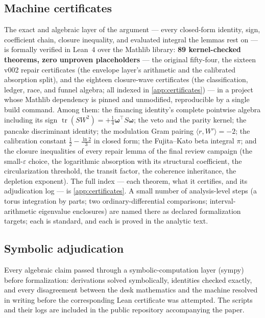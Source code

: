 \documentclass[11pt,letterpaper]{amsart}
\theoremstyle{definition}
\theoremstyle{remark}
\newcommand{\vort}{\boldsymbol{\omega}}
\begin{document}
\subsection{Machine certificates}\label{subsec:lean}
The exact and algebraic layer of the argument --- every closed-form identity, sign,
coefficient chain, closure inequality, and evaluated integral the lemmas rest on ---
is formally verified in Lean~4 over the Mathlib library: \textbf{89 kernel-checked
theorems, zero unproven placeholders} --- the original fifty-four, the
sixteen v002 repair certificates (the envelope layer's arithmetic and the
calibrated absorption split), and the eighteen closure-wave certificates
(the classification, ledger, race, and funnel algebra; all indexed in
\cref{app:certificates}) --- in a project whose Mathlib dependency is
pinned and unmodified, reproducible by a single build command. Among them: the
financing identity's complete pointwise algebra including its sign
$\operatorname{tr}(SW^2)=+\tfrac14\vort^{\top}S\vort$; the veto and the parity kernel;
the pancake discriminant identity; the modulation Gram pairing
$\langle r,W'\rangle=-2$; the calibration constant $\tfrac12-\tfrac{\ln2}{3}$ in
closed form; the Fujita--Kato beta integral $\pi$; and the closure inequalities of
every repair lemma of the final review campaign (the small-$\varepsilon$ choice, the
logarithmic absorption with its structural coefficient, the circularization threshold,
the transit factor, the coherence inheritance, the depletion exponent). The full index
--- each theorem, what it certifies, and its adjudication log --- is
\cref{app:certificates}. A small number of analysis-level steps (a torus integration
by parts; two ordinary-differential comparisons; interval-arithmetic eigenvalue
enclosures) are named there as declared formalization targets; each is standard, and
each is proved in the analytic text.

\subsection{Symbolic adjudication}\label{subsec:sympy}
Every algebraic claim passed through a symbolic-computation layer (sympy) before
formalization: derivations solved symbolically, identities checked exactly, and every
disagreement between the desk mathematics and the machine resolved in writing before
the corresponding Lean certificate was attempted. The scripts and their logs are
included in the public repository accompanying the paper.
\end{document}
